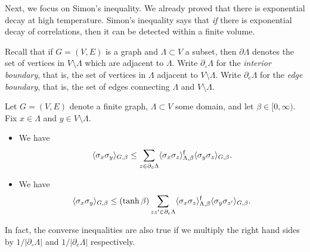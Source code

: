 Next, we focus on Simon's inequality.
We already proved that there is exponential decay at high temperature.
Simon's inequality says that \emph{if} there is exponential decay of correlations,
then it can be detected within a finite volume.

Recall that if $G=(V,E)$ is a graph and $\Lambda\subset V$
a subset, then $\partial\Lambda$ denotes the set of vertices in $V\setminus\Lambda$
which are adjacent to $\Lambda$.
Write $\partial_\circ\Lambda$ for the \emph{interior boundary},
that is, the set of vertices in $\Lambda$ adjacent to $V\setminus\Lambda$.
Write $\partial_e\Lambda$ for the \emph{edge boundary},
that is, the set of edges connecting $\Lambda$ and $V\setminus\Lambda$.

\begin{theorem}
    Let $G=(V,E)$ denote a finite graph,
    $\Lambda\subset V$ some domain,
    and let $\beta\in[0,\infty)$.
    Fix $x\in \Lambda$ and $y\in V\setminus\Lambda$.
    \begin{itemize}
        \item We have
        \[
            \langle\sigma_x\sigma_y\rangle_{G,\beta}
            \leq
            \sum_{z\in\partial_\circ\Lambda}
            \langle\sigma_x\sigma_z\rangle_{\Lambda,\beta}^{\operatorname{f}}
            \langle\sigma_y\sigma_z\rangle_{G,\beta}.
        \]
        \item We have
        \[
            \langle\sigma_x\sigma_y\rangle_{G,\beta}
            \leq
            (\tanh\beta)
            \sum_{zz'\in\partial_e\Lambda}
            \langle\sigma_x\sigma_z\rangle_{\Lambda,\beta}^{\operatorname{f}}
            \langle\sigma_y\sigma_{z'}\rangle_{G,\beta}.
        \]
    \end{itemize}
    In fact, the converse inequalities are also true if we 
    multiply the right hand sides by $1/|\partial_\circ\Lambda|$
    and $1/|\partial_e\Lambda|$ respectively.
\end{theorem}

